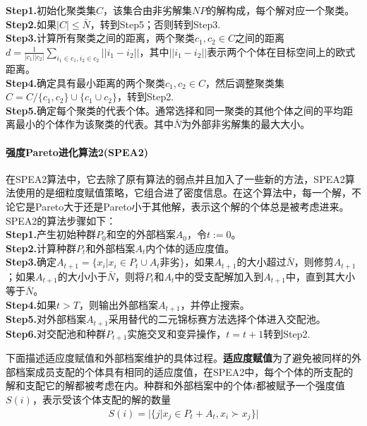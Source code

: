             \textbf{Step1.}初始化聚类集$C$，该集合由非劣解集$NP$的解构成，每个解对应一个聚类。\\
            \textbf{Step2.}如果$|C |\leqslant \bar{N}$，转到Step5；否则转到Step3.\\
            \textbf{Step3.}计算所有聚类之间的距离，两个聚类$c_1,c_2\in C$之间的距离$d=\frac{1}{|c_1||c_2|}\sum\limits_{i_1\in c_1,i_2\in c_2}||i_1-i_2||$，其中$||i_1-i_2||$表示两个个体在目标空间上的欧式距离。\\
            \textbf{Step4.}确定具有最小距离的两个聚类$c_1,c_2\in C$，然后调整聚类集$C = C/\{c_1,c_2\}\cup\{c_1\cup c_2\}$，转到Step2.\\
            \textbf{Step5.}确定每个聚类的代表个体。通常选择和同一聚类的其他个体之间的平均距离最小的个体作为该聚类的代表。其中$\bar{N}$为外部非劣解集的最大大小。
            \paragraph{强度Pareto进化算法2(SPEA2)}在SPEA2算法中，它去除了原有算法的弱点并且加入了一些新的方法，SPEA2算法使用的是细粒度赋值策略，它组合进了密度信息。在这个算法中，每一个解，不论它是Pareto大于还是Pareto小于其他解，表示这个解的个体总是被考虑进来。SPEA2的算法步骤如下：\\
            \textbf{Step1.}产生初始种群$P_0$和空的外部档案$A_0$，令$t:=0$。\\
            \textbf{Step2.}计算种群$P_t$和外部档案$A_t$内个体的适应度值。\\
            \textbf{Step3.}确定$A_{t+1} = \{x_i|x_i\in P_t\cup A_t\text{非劣}\}$，如果$A_{t+1}$的大小超过$\bar{N}$，则修剪$A_{t+1}$；如果$A_{t+1}$的大小小于$\bar{N}$，则将$P_t$和$A_t$中的受支配解加入到$A_{t+1}$中，直到其大小等于$\bar{N}$。\\
            \textbf{Step4.}如果$t>T$，则输出外部档案$A_{t+1}$，并停止搜索。\\
            \textbf{Step5.}对外部档案$A_{t+1}$采用替代的二元锦标赛方法选择个体进入交配池。\\
            \textbf{Step6.}对交配池和种群$P_{t+1}$实施交叉和变异操作，$t=t+1$转到Step2.
            \par
            下面描述适应度赋值和外部档案维护的具体过程。\textbf{适应度赋值}为了避免被同样的外部档案成员支配的个体具有相同的适应度值，在SPEA2中，每个个体的所支配的解和支配它的解都被考虑在内。种群和外部档案中的个体$i$都被赋予一个强度值$S(i)$，表示受该个体支配的解的数量
            \begin{align*}
            S(i) = |\{j|x_j\in P_t+A_t,x_i\succ x_j\}|
            \end{align*}

